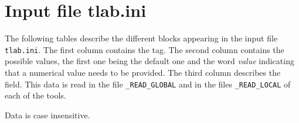 \section{Input file tlab.ini}

The following tables describe the different blocks appearing in the input file {\tt tlab.ini}. The first column contains the tag. The second column contains the possible values, the first one being the default one and the word {\it value} indicating that a numerical value needs to be provided. The third column describes the field. This data is read in the file {\tt *\_READ\_GLOBAL} and in the files {\tt *\_READ\_LOCAL} of each of the tools.

Data is case insensitive.

